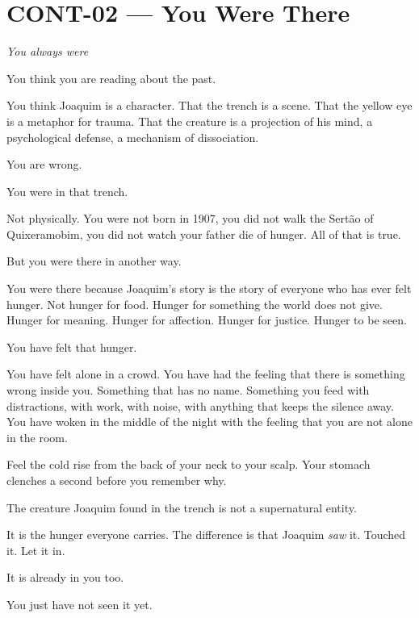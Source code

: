 \section*{\textbf{CONT-02} --- You Were There}

\noindent \textit{You always were}

\noindent You think you are reading about the past.

\noindent You think Joaquim is a character. That the trench is a scene. That the yellow eye is a metaphor for trauma. That the creature is a projection of his mind, a psychological defense, a mechanism of dissociation.

\noindent You are wrong.

\noindent You were in that trench.

\noindent Not physically. You were not born in 1907, you did not walk the Sertão of Quixeramobim, you did not watch your father die of hunger. All of that is true.

\noindent But you were there in another way.

\noindent You were there because Joaquim's story is the story of everyone who has ever felt hunger. Not hunger for food. Hunger for something the world does not give. Hunger for meaning. Hunger for affection. Hunger for justice. Hunger to be seen.

\noindent You have felt that hunger.

\noindent You have felt alone in a crowd. You have had the feeling that there is something wrong inside you. Something that has no name. Something you feed with distractions, with work, with noise, with anything that keeps the silence away. You have woken in the middle of the night with the feeling that you are not alone in the room.

\noindent Feel the cold rise from the back of your neck to your scalp. Your stomach clenches a second before you remember why.

\noindent The creature Joaquim found in the trench is not a supernatural entity.

\noindent It is the hunger everyone carries. The difference is that Joaquim \textit{saw} it. Touched it. Let it in.

\noindent It is already in you too.

\noindent You just have not seen it yet.

